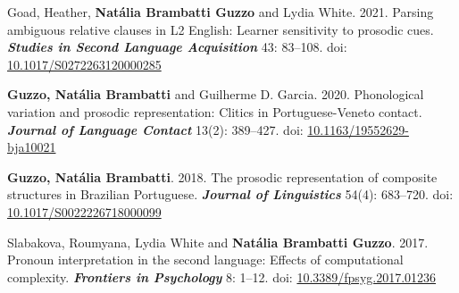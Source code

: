 \documentclass[letterpaper,10pt]{article}
\begin{document}
 Goad, Heather, \textbf{Nat\'alia Brambatti Guzzo} and Lydia White. 2021. Parsing ambiguous relative clauses in L2 English: Learner sensitivity to prosodic cues. \textbf{\emph{Studies in Second Language Acquisition}} 43: 83--108. doi: \href{https://doi.org/10.1017/S0272263120000285}{10.1017/S0272263120000285}

 \textbf{Guzzo, Nat\'alia Brambatti} and Guilherme D. Garcia. 2020. Phonological variation and prosodic representation: Clitics in Portuguese-Veneto contact. \textbf{\emph{Journal of Language Contact}} 13(2): 389--427. doi: \href{https://doi.org/10.1163/19552629-bja10021}{10.1163/19552629-bja10021}


 \textbf{Guzzo, Nat\'alia Brambatti}. 2018. The prosodic representation of composite structures in Brazilian Portuguese. \textbf{\emph{Journal of Linguistics}} 54(4): 683--720. doi: \href{https://doi.org/10.1017/S0022226718000099}{10.1017/S0022226718000099}


 Slabakova, Roumyana, Lydia White and \textbf{Nat\'alia Brambatti Guzzo}. 2017. Pronoun interpretation in the second language: Effects of computational complexity. \textbf{\emph{Frontiers in Psychology}} 8: 1--12. doi: \href{https://doi.org/10.3389/fpsyg.2017.01236}{10.3389/fpsyg.2017.01236}


\vspace{0.3cm}



%
%
%
%
%
%
%
\end{document}
